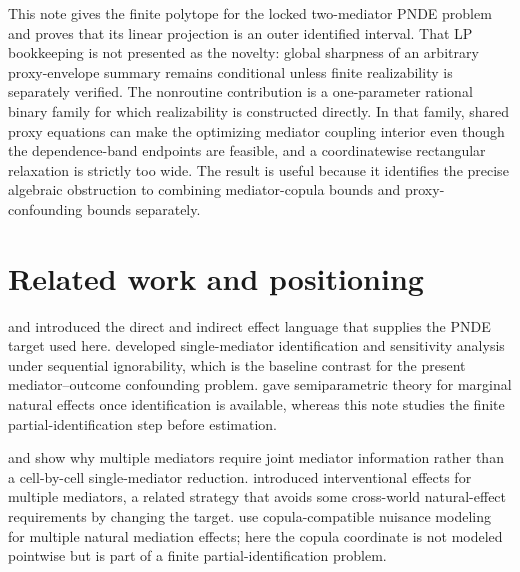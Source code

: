 \documentclass[11pt]{article}
\theoremstyle{definition}
\theoremstyle{plain}
\theoremstyle{remark}
\begin{document}
This note gives the finite polytope for the locked two-mediator PNDE problem
and proves that its linear projection is an outer identified interval.  That
LP bookkeeping is not presented as the novelty: global sharpness of an
arbitrary proxy-envelope summary remains conditional unless finite
realizability is separately verified.  The nonroutine contribution is a
one-parameter rational binary family for which realizability is constructed
directly.  In that family, shared proxy equations can make the optimizing
mediator coupling interior even though the dependence-band endpoints are
feasible, and a coordinatewise rectangular relaxation is strictly too wide.
The result is useful because it identifies the precise algebraic obstruction
to combining mediator-copula bounds and proxy-confounding bounds separately.

\section{Related work and positioning}
\cite{RobinsGreenland1992} and \cite{Pearl2001} introduced the direct and
indirect effect language that supplies the PNDE target used here.  \cite{ImaiKeeleYamamoto2010}
developed single-mediator identification and sensitivity analysis under
sequential ignorability, which is the baseline contrast for the present
mediator--outcome confounding problem.  \cite{TchetgenShpitser2012} gave
semiparametric theory for marginal natural effects once identification is
available, whereas this note studies the finite partial-identification step
before estimation.

\cite{VanderWeeleVansteelandt2014} and \cite{DanielDeStavolaCousensVansteelandt2015}
show why multiple mediators require joint mediator information rather than a
cell-by-cell single-mediator reduction.  \cite{VansteelandtDaniel2017}
introduced interventional effects for multiple mediators, a related strategy
that avoids some cross-world natural-effect requirements by changing the
target.  \cite{XiaChan2022} use copula-compatible nuisance modeling for
multiple natural mediation effects; here the copula coordinate is not modeled
pointwise but is part of a finite partial-identification problem.
\end{document}
